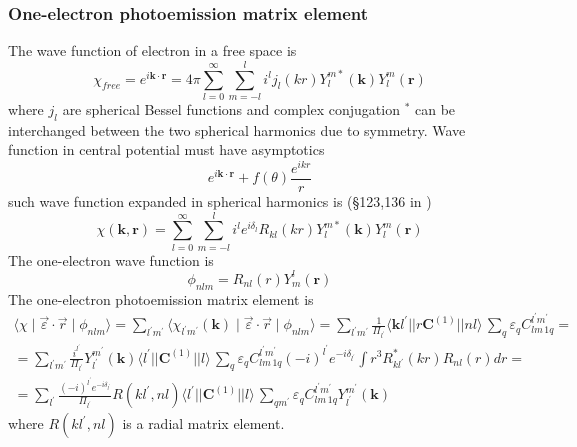 \documentclass[a4paper,oneside,12pt]{extarticle}
\begin{document}
\subsubsection {One-electron photoemission matrix element}
%
The wave function of electron in a free space is
$$
\chi_{free} = e^{i\mathbf{k}\cdot\mathbf{r}} =
4\pi \sum_{l=0}^{\infty} \sum_{m=-l}^l i^l j_l(kr) Y_l^{m*}(\mathbf{k}) Y_l^m(\mathbf{r})
$$
where $j_l$ are spherical Bessel functions and complex conjugation $^*$ can be interchanged between the two spherical harmonics due to symmetry. 
Wave function in central potential must have asymptotics 
$$
e^{i\mathbf{k}\cdot\mathbf{r}} + f(\theta) \frac{e^{ikr}}{r}
$$
such wave function expanded in spherical harmonics is (\S 123,136 in \cite{Landau3})
$$
\chi(\mathbf{k},\mathbf{r}) = 
\sum_{l=0}^{\infty} \sum_{m=-l}^l i^l e^{i\delta_l} R_{kl}(kr) Y_l^{m*}(\mathbf{k}) Y_l^m(\mathbf{r}) 
$$
The one-electron wave function is
$$
\phi_{nlm} = R_{nl}(r) Y^l_m(\mathbf{r})
$$
The one-electron photoemission matrix element is
\begin{multline}
\langle \chi \mid \vec{\varepsilon} \cdot \vec{r} \mid \phi_{nlm} \rangle =
\sum_{l^{\prime}m^{\prime}} \langle \chi_{l^{\prime}m^{\prime}}(\mathbf{k}) \mid \vec{\varepsilon} \cdot \vec{r} \mid \phi_{nlm} \rangle =
\sum_{l^{\prime}m^{\prime}} \frac{1}{\Pi_{l^{\prime}}}
\langle \mathbf{k}l^{\prime} || r\mathbf{C}^{(1)} || nl \rangle  \,
\sum_q  \varepsilon_q C_{l m \, 1 q}^{l^{\prime} m^{\prime}} =\\
= \sum_{l^{\prime}m^{\prime}} \frac{i^{l^{\prime}}}{\Pi_{l^{\prime}}} Y_{l^{\prime}}^{m^{\prime}}(\mathbf{k})
\langle l^{\prime} || \mathbf{C}^{(1)} || l \rangle  \,
\sum_q  \varepsilon_q C_{l m \, 1 q}^{l^{\prime} m^{\prime}} (-i)^{l^{\prime}}e^{-i\delta_{l^{\prime}}} \int r^3 R^*_{k{l^{\prime}}}(kr) R_{nl}(r) dr = \\
= \sum_{l^{\prime}} \frac{(-i)^{l^{\prime}}e^{-i\delta_{l^{\prime}}}}{\Pi_{l^{\prime}}} R(kl^{\prime},nl) 
\langle l^{\prime} || \mathbf{C}^{(1)} || l \rangle  \,
\sum_{q m^{\prime}}  \varepsilon_q C_{l m \, 1 q}^{l^{\prime} m^{\prime}} Y_{l^{\prime}}^{m^{\prime}}(\mathbf{k})
\end{multline}
where $R(kl^{\prime},nl)$ is a radial matrix element.
\end{document}
